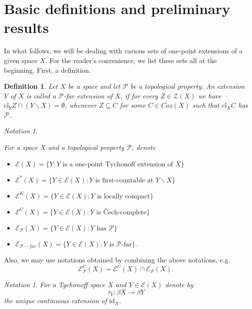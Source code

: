 \documentclass{amsart}
\theoremstyle{definition}
\newtheorem{definition}[theorem]{Definition}
\theoremstyle{remark}
\theoremstyle{notation}
\newtheorem{notation}[theorem]{Notation}
\numberwithin{equation}{section}
\begin{document}
\section{Basic definitions and preliminary results}

In what follows, we will be dealing with various sets of one-point extensions of a given space $X$.
For the reader's convenience, we list these sets all at the beginning. First, a definition.

\begin{definition}\label{JSB}
{\em Let $X$ be a space and let ${\mathcal P}$ be a topological property.
An extension $Y$ of $X$ is called a {\em ${\mathcal P}$-far extension} of $X$, if for every  $Z\in {\mathscr Z}(X)$ we have
$\mbox{cl}_Y Z\cap (Y\backslash X)=\emptyset$, whenever
$Z\subseteq C$  for some $C\in Coz(X)$ such that $\mbox{cl}_X C$ has ${\mathcal P}$.}
\end{definition}

\begin{notation}\label{JHB}
{\em For a space $X$ and  a topological property  ${\mathcal P}$, denote
\begin{itemize}
  \item ${\mathscr E}(X)=\{Y:Y \mbox{ is a one-point Tychonoff extension of } X\}$
  \item ${\mathscr E}^*(X)=\{Y\in{\mathscr E}(X):Y \mbox{ is first-countable at } Y\backslash X\}$
  \item ${\mathscr E}^K(X)=\{Y\in{\mathscr E}(X):Y \mbox{ is locally compact}\}$
  \item ${\mathscr E}^C(X)=\{Y\in{\mathscr E}(X):Y \mbox{ is \v{C}ech-complete}\}$
  \item ${\mathscr E}_{{\mathcal P}}(X)=\{Y\in{\mathscr E}(X) :Y \mbox{ has  } {\mathcal P}\}$
  \item ${\mathscr E}_{{\mathcal P}-far}(X)=\{Y\in{\mathscr E}(X) :Y \mbox{ is ${\mathcal P}$-far}\}$.
\end{itemize}
Also, we may use notations obtained by combining the above notations, e.g.
\[{\mathscr E}^C_{{\mathcal P}}(X)={\mathscr E}^C(X)\cap{\mathscr E}_{{\mathcal P}}(X).\]}
\end{notation}

\begin{notation}\label{KJB}
{\em For a Tychonoff space $X$  and  $Y\in {\mathscr E}(X)$ denote by
\[\tau_Y:\beta X\rightarrow \beta Y\]
the unique continuous extension of $\mbox{id}_X$.}
\end{notation}
\end{document}
